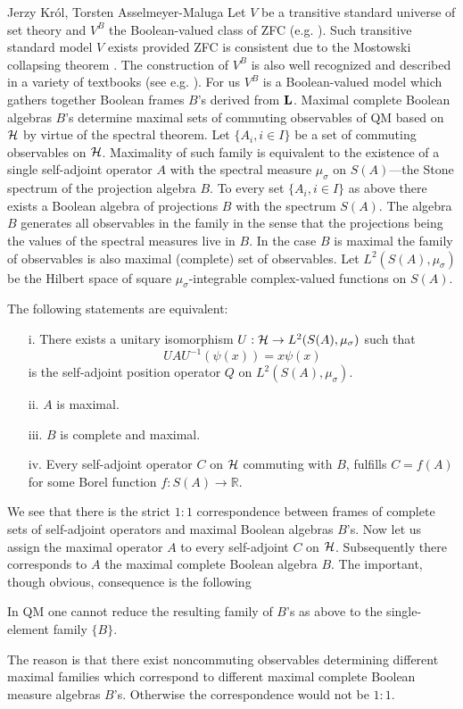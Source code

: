 \begin{artengenv2auth}{Jerzy Kr\'ol, Torsten Asselmeyer-Maluga}
Let $V$ be a transitive standard universe of set theory and $V^B$ the Boolean-valued class of ZFC (e.g. \cite{Jech2003}). Such transitive standard model $V$ exists provided ZFC is consistent due to the Mostowski collapsing theorem \parencite{Jech2003}. The construction of $V^B$ is also well recognized and described in a variety of textbooks (see e.g. \cite{Jech2003,Bell2005}). For us $V^B$ is a Boolean-valued model which gathers together Boolean frames $B$'s derived from ${\bf L}$. Maximal complete Boolean algebras $B$'s determine maximal sets of commuting observables of QM based on ${\cal H}$ by virtue of the spectral theorem. Let $\{A_i,i\in I\}$ be a set of commuting observables on ${\cal H}$. Maximality of such family is equivalent to the existence of a single self-adjoint operator $A$ with the spectral measure $\mu_{\sigma}$ on $S(A)$---the Stone spectrum of the projection algebra $B$. To every set $\{A_i,i\in I\}$ as above there exists a Boolean algebra of projections $B$ with the spectrum $S(A)$. The algebra $B$ generates all observables in the family in the sense that the projections being the values of the spectral measures live in $B$. In the case $B$ is maximal the family of observables is also maximal (complete) set of observables. Let $L^2(S(A),\mu_{\sigma})$ be the Hilbert space of square $\mu_{\sigma}$-integrable complex-valued functions on $S(A)$. 
\begin{Lemma}\parencite{Boos1996}
The following statements are equivalent:
\begin{itemize}
    \item[i.] There exists a unitary isomorphism $U:{\cal H}\to L^2(S(A),\mu_{\sigma})$ such that 
    \[UAU^{-1}(\psi(x))=x\psi(x)
    \] is the self-adjoint position operator $Q$ on $L^2(S(A),\mu_{\sigma})$.
\item[ii.]  $A$ is maximal.
\item[iii.] $B$ is complete and maximal.
\item[iv.] Every self-adjoint operator $C$ on ${\cal H}$ commuting with $B$, fulfills $C=f(A)$ for some Borel function $f:S(A)\to \mathbb{R}$.
\end{itemize}
\end{Lemma}
We see that there is the strict $1:1$ correspondence between frames of complete sets of self-adjoint operators and maximal Boolean algebras $B$'s. Now let us assign the maximal operator $A$ to every self-adjoint $C$ on ${\cal H}$. Subsequently there corresponds to $A$ the maximal complete Boolean algebra $B$. The important, though obvious, consequence is the following
\begin{Corollary}\label{corr1}
In QM one cannot reduce the resulting family of $B$'s as above to the single-element family $\{B\}$.
\end{Corollary}
The reason is that there exist noncommuting observables determining different maximal families which correspond to different maximal complete Boolean measure algebras $B$'s. Otherwise the correspondence would not be $1:1$.


\end{artengenv2auth}
